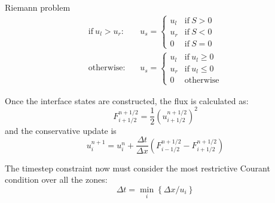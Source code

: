 Riemann problem
\begin{eqnarray}
\mathrm{if~} u_l > u_r:&& u_s = \left \{ \begin{array}{cl}
                u_l & \mathrm{if~} S > 0 \\ 
                u_r & \mathrm{if~} S < 0 \\
                0   & \mathrm{if~} S = 0 \end{array} \right .   \\[1em]
%
\mathrm{otherwise:}&& u_s = \left \{ \begin{array}{clc}
                u_l & \mathrm{if~} u_l \ge 0 \\  
                u_r & \mathrm{if~} u_l \le 0 \\  
                0   & \mathrm{otherwise} \end{array} \right .   
\end{eqnarray}
               
Once the interface states are constructed, the flux is calculated as:
\begin{equation}
F^{n+1/2}_{i+1/2} = \frac{1}{2} \left (u_{i+1/2}^{n+1/2} \right )^2
\end{equation}
and the conservative update is
\begin{equation}
u_i^{n+1} = u_i^n + \frac{\Delta t}{\Delta x} 
   \left ( F_{i-1/2}^{n+1/2} - F_{i+1/2}^{n+1/2} \right )
\end{equation}

The timestep constraint now must consider the most restrictive Courant 
condition over all the zones:
\begin{equation}
\Delta t = \min_i \left \{ \Delta x / u_i \right \}
\end{equation}


